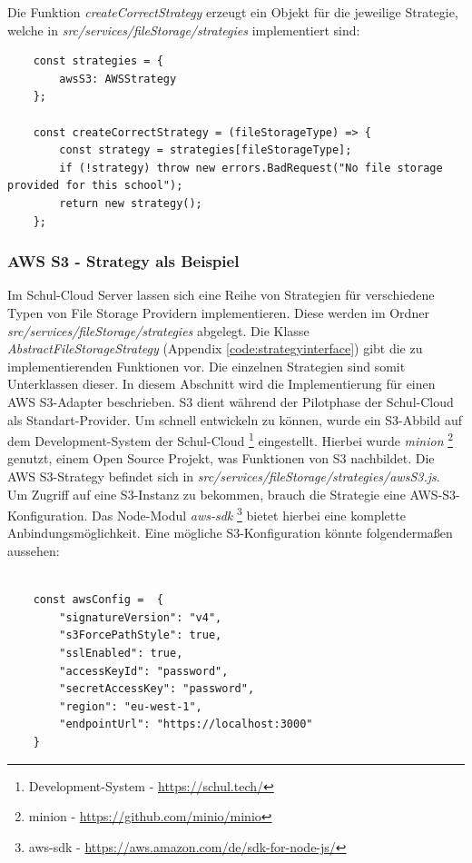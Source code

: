 Die Funktion \textit{createCorrectStrategy} erzeugt ein Objekt für die jeweilige Strategie, welche in \textit{src/services/fileStorage/strategies} implementiert sind:

\begin{lstlisting}
	const strategies = {
		awsS3: AWSStrategy
	};

	const createCorrectStrategy = (fileStorageType) => {
		const strategy = strategies[fileStorageType];
		if (!strategy) throw new errors.BadRequest("No file storage provided for this school");
		return new strategy();
	};
\end{lstlisting}

\subsubsection{AWS S3 - Strategy als Beispiel}

Im Schul-Cloud Server lassen sich eine Reihe von Strategien für verschiedene Typen von File Storage Providern implementieren. Diese werden im Ordner \textit{src/services/fileStorage/strategies} abgelegt. Die Klasse \textit{AbstractFileStorageStrategy} (Appendix \ref{code:strategyinterface}) gibt die zu implementierenden Funktionen vor. Die einzelnen Strategien sind somit Unterklassen dieser. In diesem Abschnitt wird die Implementierung für einen AWS S3-Adapter beschrieben. S3 dient während der Pilotphase der Schul-Cloud als Standart-Provider. Um schnell entwickeln zu können, wurde ein S3-Abbild auf dem Development-System der Schul-Cloud \footnote{Development-System - \url{https://schul.tech/}} eingestellt. Hierbei wurde \textit{minion} \footnote{minion - \url{https://github.com/minio/minio}} genutzt, einem Open Source Projekt, was Funktionen von S3 nachbildet. Die AWS S3-Strategy befindet sich in \textit{src/services/fileStorage/strategies/awsS3.js}. \\

Um Zugriff auf eine S3-Instanz zu bekommen, brauch die Strategie eine AWS-S3-Konfiguration. Das Node-Modul \textit{aws-sdk} \footnote{aws-sdk - \url{https://aws.amazon.com/de/sdk-for-node-js/}} bietet hierbei eine komplette Anbindungsmöglichkeit. Eine mögliche S3-Konfiguration könnte folgendermaßen aussehen:

\begin{lstlisting}
	
	const awsConfig =  {
		"signatureVersion": "v4",
		"s3ForcePathStyle": true,
		"sslEnabled": true,
		"accessKeyId": "password",
		"secretAccessKey": "password",
		"region": "eu-west-1",
		"endpointUrl": "https://localhost:3000"
	}
\end{lstlisting}

